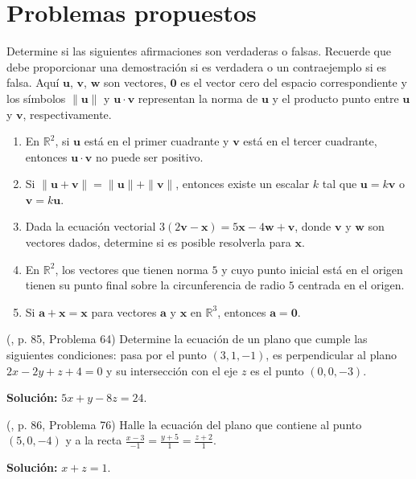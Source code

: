 \section{Problemas propuestos}
\begin{prob} Determine si las siguientes afirmaciones son verdaderas o falsas. Recuerde que debe proporcionar una demostración si es verdadera o un contraejemplo si es falsa. Aquí $\mathbf{u}$, $\mathbf{v}$, $\mathbf{w}$ son vectores, $\mathbf{0}$ es el vector cero del espacio correspondiente y los símbolos $\|\mathbf{u}\|$ y $\mathbf{u} \cdot \mathbf{v}$ representan la norma de $\mathbf{u}$ y el producto punto entre $\mathbf{u}$ y $\mathbf{v}$, respectivamente.
\begin{enumerate}[$a)$]
 \item En $\mathbb{R}^2$, si $\mathbf{u}$ está en el primer cuadrante y $\mathbf{v}$ está en el tercer cuadrante, entonces $\mathbf{u} \cdot \mathbf{v}$ no puede ser positivo.
\item Si $\|\mathbf{u}+\mathbf{v}\|=\|\mathbf{u}\|+\|\mathbf{v}\|$, entonces existe un escalar $k$ tal que $\mathbf{u}=k\mathbf{v}$ o $\mathbf{v}=k\mathbf{u}$.
\item Dada la ecuación vectorial $3(2\mathbf{v}-\mathbf{x})=5\mathbf{x}-4\mathbf{w}+\mathbf{v}$, donde $\mathbf{v}$ y $\mathbf{w}$ son vectores dados, determine si es posible resolverla para $\mathbf{x}$.
\item En $\mathbb{R}^2$, los vectores que tienen norma $5$ y cuyo punto inicial está en el origen tienen su punto final sobre la circunferencia de radio $5$ centrada en el origen.
\item Si $\mathbf{a}+\mathbf{x}=\mathbf{x}$ para vectores $\mathbf{a}$ y $\mathbf{x}$ en $\mathbb{R}^3$, entonces $\mathbf{a}=\mathbf{0}$.
\end{enumerate}
\end{prob}

\begin{prob} (\cite{espinoza2006Algebralineal}, p. 85, Problema 64) Determine la ecuación de un plano que cumple las siguientes condiciones: pasa por el punto $(3,1,-1)$, es perpendicular al plano $2x-2y+z+4=0$ y su intersección con el eje $z$ es el punto $(0,0,-3)$. 

\textbf{Solución:} $5x+y-8z=24$.
\end{prob}

\begin{prob} (\cite{espinoza2006Algebralineal}, p. 86, Problema 76) Halle la ecuación del plano que contiene al punto $(5,0,-4)$ y a la recta $\frac{x-3}{-1}=\frac{y+5}{1}=\frac{z+2}{1}$. 

\textbf{Solución:} $x+z=1$.
\end{prob}

